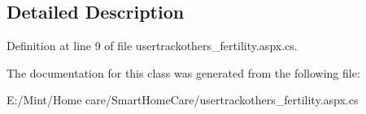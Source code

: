 \subsection{Detailed Description}


Definition at line 9 of file usertrackothers\-\_\-fertility.\-aspx.\-cs.



The documentation for this class was generated from the following file\-:\begin{DoxyCompactItemize}
\item 
E\-:/\-Mint/\-Home care/\-Smart\-Home\-Care/usertrackothers\-\_\-fertility.\-aspx.\-cs\end{DoxyCompactItemize}
